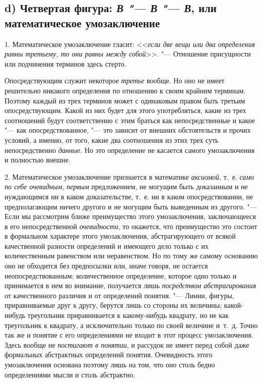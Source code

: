 \subsection[d) Четвертая фигура]
{d) Четвертая фигура: {\em В "--- В "--- В}, или математическое умозаключение}
\label{bkm:bm110a}
1. Математическое умозаключение гласит:
<<{\em если две вещи или два определения
равны третьему, то они равны между собой}>>. "--- Отношение
присущности или подчинения терминов здесь стерто.

Опосредствующим служит некоторое
{\em третье} вообще. Но
оно не имеет решительно никакого определения по отношению к своим крайним
терминам. Поэтому каждый из трех терминов может с одинаковым правом быть
третьим опосредствующим. Какой из них будет для этого употребляться, какие
из трех соотношений будут соответственно с этим браться как
непосредственные и какое "--- как опосредствованное, "---
это зависит от внешних обстоятельств и прочих условий, а
именно, от того, какие два соотношения из этих трех суть непосредственно
{\em данные}. Но это
определение не касается самого умозаключения и полностью внешне.

2. Математическое умозаключение признается в математике
{\em аксиомой}, т.~е.
{\em само по себе очевидным},
{\em первым} предложением,
не могущим быть доказанным и не нуждающимся ни в каком доказательстве,
т.~е. ни в каком опосредствовании, не предполагающим ничего другого и не
могущим быть выведенным из другого. "--- Если мы рассмотрим
ближе преимущество этого умозаключения, заключающееся в его
непосредственной {\em очевидности},
то окажется, что преимущество это состоит в формальном
характере этого умозаключения, абстрагирующего от всякой качественной
разности определений и имеющего дело только с их количественным равенством
или неравенством. Но по тому же самому основанию оно не обходится без
предпосылки или, иначе говоря, не остается неопосредствованным;
количественное определение, которое одно только и принимается в нем во
внимание, получается лишь
{\em посредством абстрагирования}
от качественного различия и от определений понятия. "---
Линии, фигуры, приравниваемые друг к другу, берутся лишь со
стороны их величины; какой-нибудь треугольник приравнивается к
какому-нибудь квадрату, но не как треугольник к квадрату, а исключительно
только по своей величине и~т.~д. Точно так же и понятие с его определениями
не входит в этот процесс умозаключения. Здесь вообще не
{\em постигают в понятии},
и рассудок не имеет перед собой даже формальных абстрактных
определений понятия. Очевидность этого умозаключения основана поэтому лишь
на том, что оно столь бедно определениями мысли и столь абстрактно.

